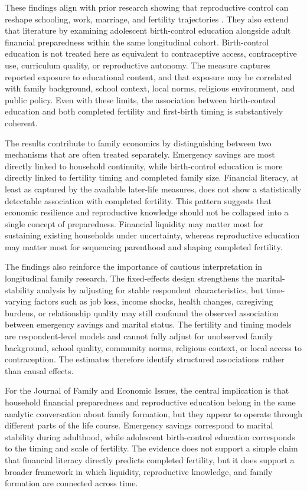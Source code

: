 \documentclass[12pt]{article}
\begin{document}
These findings align with prior research showing that reproductive control can reshape schooling, work, marriage, and fertility trajectories \citep{goldin2002,bailey2010,kearney2009,lindberg2016,myers2017}. They also extend that literature by examining adolescent birth-control education alongside adult financial preparedness within the same longitudinal cohort. Birth-control education is not treated here as equivalent to contraceptive access, contraceptive use, curriculum quality, or reproductive autonomy. The measure captures reported exposure to educational content, and that exposure may be correlated with family background, school context, local norms, religious environment, and public policy. Even with these limits, the association between birth-control education and both completed fertility and first-birth timing is substantively coherent.

The results contribute to family economics by distinguishing between two mechanisms that are often treated separately. Emergency savings are most directly linked to household continuity, while birth-control education is more directly linked to fertility timing and completed family size. Financial literacy, at least as captured by the available later-life measures, does not show a statistically detectable association with completed fertility. This pattern suggests that economic resilience and reproductive knowledge should not be collapsed into a single concept of preparedness. Financial liquidity may matter most for sustaining existing households under uncertainty, whereas reproductive education may matter most for sequencing parenthood and shaping completed fertility.

The findings also reinforce the importance of cautious interpretation in longitudinal family research. The fixed-effects design strengthens the marital-stability analysis by adjusting for stable respondent characteristics, but time-varying factors such as job loss, income shocks, health changes, caregiving burdens, or relationship quality may still confound the observed association between emergency savings and marital status. The fertility and timing models are respondent-level models and cannot fully adjust for unobserved family background, school quality, community norms, religious context, or local access to contraception. The estimates therefore identify structured associations rather than causal effects.

For the Journal of Family and Economic Issues, the central implication is that household financial preparedness and reproductive education belong in the same analytic conversation about family formation, but they appear to operate through different parts of the life course. Emergency savings correspond to marital stability during adulthood, while adolescent birth-control education corresponds to the timing and scale of fertility. The evidence does not support a simple claim that financial literacy directly predicts completed fertility, but it does support a broader framework in which liquidity, reproductive knowledge, and family formation are connected across time.
\end{document}
